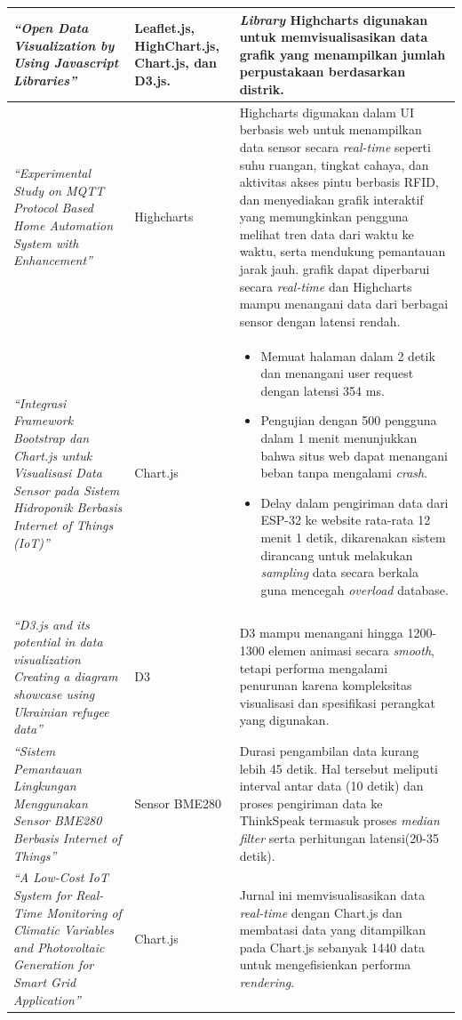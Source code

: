 \begin{longtable}{
		|p{}|
		p{}|
		p{}|}
	\textit{“Open Data Visualization by Using Javascript Libraries”} \cite{Vueti2023} &Leaflet.js, HighChart.js, Chart.js, dan D3.js. & \textit{Library} Highcharts digunakan untuk memvisualisasikan data grafik yang menampilkan jumlah perpustakaan berdasarkan distrik. \\ \hline
	\textit{“Experimental Study on MQTT Protocol Based Home Automation System with Enhancement”} \cite{Manna2024} & Highcharts & Highcharts digunakan dalam UI berbasis web untuk menampilkan data sensor secara \textit{real-time} seperti suhu ruangan, tingkat cahaya, dan aktivitas akses pintu berbasis RFID, dan menyediakan grafik interaktif yang memungkinkan pengguna melihat tren data dari waktu ke waktu, serta mendukung pemantauan jarak jauh. grafik dapat diperbarui secara \textit{real-time} dan Highcharts mampu menangani data dari berbagai sensor dengan latensi rendah.\\ \hline
	\textit{“Integrasi Framework Bootstrap dan Chart.js untuk Visualisasi Data Sensor pada Sistem Hidroponik Berbasis Internet of Things (IoT)”} \cite{Toppany2023} & Chart.js & 
	\begin{itemize}
		\item[-] Memuat halaman dalam 2 detik dan menangani user request dengan latensi 354 ms. 
		\item[-]  Pengujian dengan 500 pengguna dalam 1 menit menunjukkan bahwa situs web dapat menangani beban tanpa mengalami \textit{crash}.
		\item[-] Delay dalam pengiriman data dari ESP-32 ke website rata-rata 12 menit 1 detik, dikarenakan sistem dirancang untuk melakukan \textit{sampling} data secara berkala guna mencegah \textit{overload} database.
	\end{itemize} \\ \hline
	\textit{“D3.js and its potential in data visualization Creating a diagram showcase using Ukrainian refugee data”} \cite{Toppany2023} & D3 & 
	D3 mampu menangani hingga 1200-1300 elemen animasi secara \textit{smooth}, tetapi performa mengalami penurunan karena kompleksitas visualisasi dan spesifikasi perangkat yang digunakan. \\ \hline
	\textit{“Sistem Pemantauan Lingkungan Menggunakan Sensor BME280 Berbasis Internet of Things”} \cite{Toppany2023} & Sensor BME280 & 
	Durasi pengambilan data kurang lebih 45 detik. Hal tersebut meliputi interval antar data (10 detik) dan proses pengiriman data ke ThinkSpeak termasuk proses \textit{median filter} serta perhitungan latensi(20-35 detik). \\ \hline
	\textit{“A Low-Cost IoT System for Real-Time Monitoring of Climatic Variables and Photovoltaic Generation for Smart Grid Application”} \cite{Toppany2023} & Chart.js & 
	 Jurnal ini memvisualisasikan data \textit{real-time} dengan Chart.js dan membatasi data yang ditampilkan pada Chart.js sebanyak 1440 data untuk mengefisienkan performa \textit{rendering}. \\ \hline
\end{longtable}

